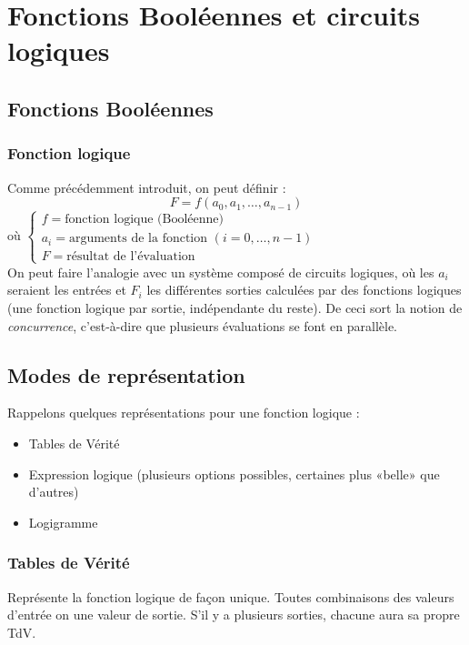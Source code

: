 \chapter{Fonctions Booléennes et circuits logiques}
\section{Fonctions Booléennes}
\subsection{Fonction logique}
Comme précédemment introduit, on peut définir :
\begin{equation}
	F=f(a_0,a_1,\dots,a_{n-1})
\end{equation} 
\hfill où $
\left\{
	\begin{array}{l}
		f = \text{fonction logique (Booléenne)}\\
		a_i= \text{arguments de la fonction } (i=0,\dots,n-1)\\
		F= \text{résultat de l'évaluation}
	\end{array}
\right.
$\\

On peut faire l'analogie avec un système composé de circuits logiques, où les $a_i$ seraient les entrées et $F_i$ les différentes sorties calculées par des fonctions logiques (une fonction logique par sortie, indépendante du reste). De ceci sort la notion de \textit{concurrence}, c'est-à-dire que plusieurs évaluations se font en parallèle.
\section{Modes de représentation}
Rappelons quelques représentations pour une fonction logique :
\begin{itemize}
	\item Tables de Vérité
	\item Expression logique (plusieurs options possibles, certaines plus «belle» que d'autres)
	\item Logigramme
\end{itemize}
\subsection{Tables de Vérité}
Représente la fonction logique de façon unique. Toutes combinaisons des valeurs d'entrée on une valeur de sortie. S'il y a plusieurs sorties, chacune aura sa propre TdV. \\

